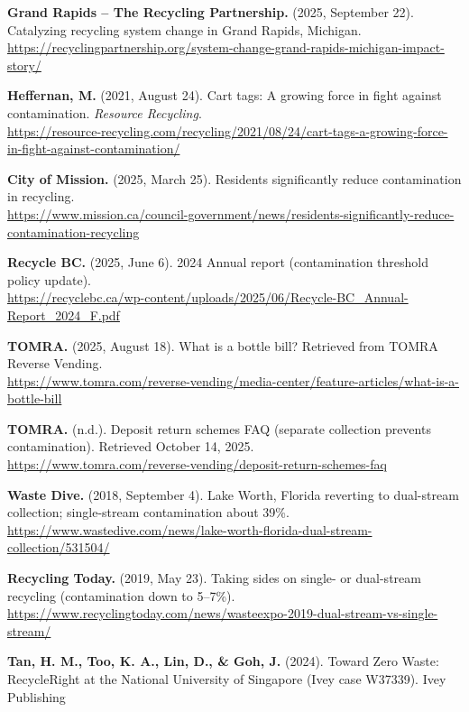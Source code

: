 \documentclass[12pt]{article}
\begin{document}
\raggedright
\setlength{\parskip}{0.5em}

\textbf{Grand Rapids -- The Recycling Partnership.} (2025, September 22). Catalyzing recycling system change in Grand Rapids, Michigan. \\
\url{https://recyclingpartnership.org/system-change-grand-rapids-michigan-impact-story/}

\textbf{Heffernan, M.} (2021, August 24). Cart tags: A growing force in fight against contamination. \textit{Resource Recycling}. \\
\url{https://resource-recycling.com/recycling/2021/08/24/cart-tags-a-growing-force-in-fight-against-contamination/}

\textbf{City of Mission.} (2025, March 25). Residents significantly reduce contamination in recycling. \\
\url{https://www.mission.ca/council-government/news/residents-significantly-reduce-contamination-recycling}

\textbf{Recycle BC.} (2025, June 6). 2024 Annual report (contamination threshold policy update). \\
\url{https://recyclebc.ca/wp-content/uploads/2025/06/Recycle-BC_Annual-Report_2024_F.pdf}

\textbf{TOMRA.} (2025, August 18). What is a bottle bill? Retrieved from TOMRA Reverse Vending. \\
\url{https://www.tomra.com/reverse-vending/media-center/feature-articles/what-is-a-bottle-bill}

\textbf{TOMRA.} (n.d.). Deposit return schemes FAQ (separate collection prevents contamination). Retrieved October 14, 2025. \\
\url{https://www.tomra.com/reverse-vending/deposit-return-schemes-faq}

\textbf{Waste Dive.} (2018, September 4). Lake Worth, Florida reverting to dual-stream collection; single-stream contamination about 39\%. \\
\url{https://www.wastedive.com/news/lake-worth-florida-dual-stream-collection/531504/}

\textbf{Recycling Today.} (2019, May 23). Taking sides on single- or dual-stream recycling (contamination down to 5--7\%). \\
\url{https://www.recyclingtoday.com/news/wasteexpo-2019-dual-stream-vs-single-stream/}

\textbf{Tan, H. M., Too, K. A., Lin, D., \& Goh, J.} (2024). Toward Zero Waste: RecycleRight at the National University of Singapore (Ivey case W37339). Ivey Publishing
\end{document}
